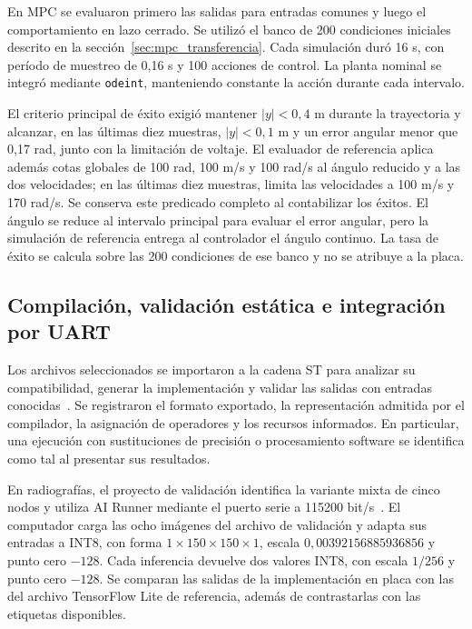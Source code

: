En MPC se evaluaron primero las salidas para entradas comunes y luego el comportamiento en lazo cerrado. Se utilizó el banco de 200 condiciones iniciales descrito en la sección~\ref{sec:mpc_transferencia}. Cada simulación duró 16 s, con período de muestreo de 0,16 s y 100 acciones de control. La planta nominal se integró mediante \texttt{odeint}, manteniendo constante la acción durante cada intervalo.

El criterio principal de éxito exigió mantener $|y|<0{,}4$ m durante la trayectoria y alcanzar, en las últimas diez muestras, $|y|<0{,}1$ m y un error angular menor que 0,17 rad, junto con la limitación de voltaje. El evaluador de referencia aplica además cotas globales de 100 rad, 100 m/s y 100 rad/s al ángulo reducido y a las dos velocidades; en las últimas diez muestras, limita las velocidades a 100 m/s y 170 rad/s. Se conserva este predicado completo al contabilizar los éxitos. El ángulo se reduce al intervalo principal para evaluar el error angular, pero la simulación de referencia entrega al controlador el ángulo continuo. La tasa de éxito se calcula sobre las 200 condiciones de ese banco y no se atribuye a la placa.

\subsection{Compilación, validación estática e integración por UART}\label{sec:validacion_st}

Los archivos seleccionados se importaron a la cadena ST para analizar su compatibilidad, generar la implementación y validar las salidas con entradas conocidas~\cite{cap5_stcompiler,cap5_stvalidacion}. Se registraron el formato exportado, la representación admitida por el compilador, la asignación de operadores y los recursos informados. En particular, una ejecución con sustituciones de precisión o procesamiento software se identifica como tal al presentar sus resultados.

En radiografías, el proyecto de validación identifica la variante mixta de cinco nodos y utiliza AI Runner mediante el puerto serie a 115200 bit/s~\cite{cap5_integracion}. El computador carga las ocho imágenes del archivo de validación y adapta sus entradas a INT8, con forma $1\times150\times150\times1$, escala $0{,}00392156885936856$ y punto cero $-128$. Cada inferencia devuelve dos valores INT8, con escala $1/256$ y punto cero $-128$. Se comparan las salidas de la implementación en placa con las del archivo TensorFlow Lite de referencia, además de contrastarlas con las etiquetas disponibles.

